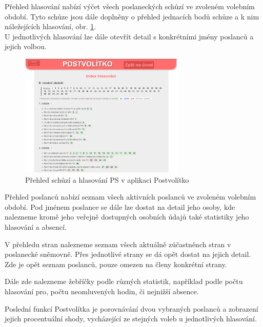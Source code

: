 \par Přehled hlasování nabízí výčet všech poslaneckých schůzí ve zvoleném volebním období. Tyto schůze jsou dále doplněny o přehled jednacích bodů schůze a k nim náležejících hlasování, obr. \ref{fig:postvolitko-hlasovani}. \\
U jednotlivých hlasování lze dále otevřít detail s konkrétními jmény poslanců a jejich volbou.

\begin{figure}
    \centering
    \includegraphics[width=0.7\textwidth]{obrazky-figures/postvolitko-hlasovani.png}
    \caption{Přehled schůzí a hlasování PS v aplikaci Postvolítko}
    \label{fig:postvolitko-hlasovani}
\end{figure}

\par Přehled poslanců nabízí seznam všech aktivních poslanců ve zvoleném volebním období. Pod jménem poslance se dále lze dostat na detail jeho osoby, kde nalezneme kromě jeho veřejně dostupných osobních údajů také statistiky jeho hlasování a absencí.


\par V přehledu stran nalezneme seznam všech aktuálně zúčastněnch stran v poslanecké sněmovně. Přes jednotlivé strany se dá opět dostat na jejich detail. Zde je opět seznam poslanců, pouze omezen na členy konkrétní strany.

\par Dále zde nalezneme žebříčky podle různých statistik, například podle počtu hlasování pro, počtu neomluvených hodin, či nejnižší absence. 
\par Poslední funkcí Postvolítka je porovnávání dvou vybraných poslanců a zobrazení jejich procentuální shody, vycházející ze stejných voleb u jednotlivých hlasování.


